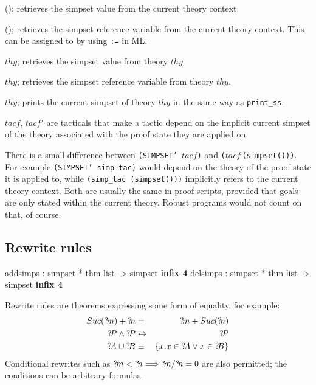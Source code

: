 \begin{ttdescription}
  
\item[\ttindexbold{simpset}();] retrieves the simpset value from the
  current theory context.
  
\item[\ttindexbold{simpset_ref}();] retrieves the simpset reference
  variable from the current theory context.  This can be assigned to
  by using \texttt{:=} in ML.
  
\item[\ttindexbold{simpset_of} $thy$;] retrieves the simpset value
  from theory $thy$.
  
\item[\ttindexbold{simpset_ref_of} $thy$;] retrieves the simpset
  reference variable from theory $thy$.

\item[\ttindexbold{print_simpset} $thy$;] prints the current simpset
  of theory $thy$ in the same way as \texttt{print_ss}.

\item[\ttindexbold{SIMPSET} $tacf$, \ttindexbold{SIMPSET'} $tacf'$]
  are tacticals that make a tactic depend on the implicit current
  simpset of the theory associated with the proof state they are
  applied on.

\end{ttdescription}

\begin{warn}
  There is a small difference between \texttt{(SIMPSET'~$tacf$)} and
  \texttt{($tacf\,$(simpset()))}.  For example \texttt{(SIMPSET'
    simp_tac)} would depend on the theory of the proof state it is
  applied to, while \texttt{(simp_tac (simpset()))} implicitly refers
  to the current theory context.  Both are usually the same in proof
  scripts, provided that goals are only stated within the current
  theory.  Robust programs would not count on that, of course.
\end{warn}


\subsection{Rewrite rules}
\begin{ttbox}
addsimps : simpset * thm list -> simpset \hfill{\bf infix 4}
delsimps : simpset * thm list -> simpset \hfill{\bf infix 4}
\end{ttbox}

 Rewrite rules are theorems expressing some
form of equality, for example:
\begin{eqnarray*}
  Suc(\Var{m}) + \Var{n} &=&      \Var{m} + Suc(\Var{n}) \\
  \Var{P}\conj\Var{P}    &\bimp&  \Var{P} \\
  \Var{A} \un \Var{B} &\equiv& \{x.x\in \Var{A} \disj x\in \Var{B}\}
\end{eqnarray*}
Conditional rewrites such as ${?\!m}<{?\!n} \Longrightarrow {?\!m}/{?\!n} =
0$ are also permitted; the conditions can be arbitrary formulas.


